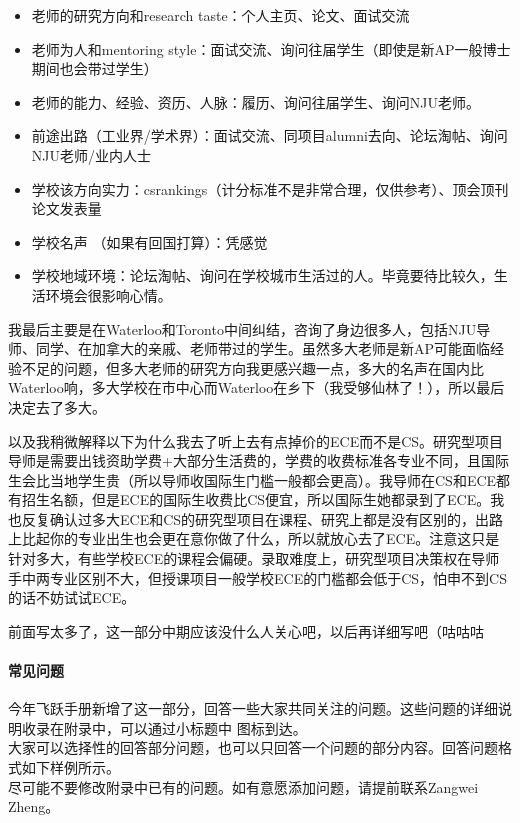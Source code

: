 \begin{itemize}
    \item 老师的研究方向和research taste：个人主页、论文、面试交流
    \item 老师为人和mentoring style：面试交流、询问往届学生（即使是新AP一般博士期间也会带过学生）
    \item 老师的能力、经验、资历、人脉：履历、询问往届学生、询问NJU老师。
    \item 前途出路（工业界/学术界）：面试交流、同项目alumni去向、论坛淘帖、询问NJU老师/业内人士
    \item 学校该方向实力：csrankings（计分标准不是非常合理，仅供参考）、顶会顶刊论文发表量
    \item 学校名声 （如果有回国打算）：凭感觉
    \item 学校地域环境：论坛淘帖、询问在学校城市生活过的人。毕竟要待比较久，生活环境会很影响心情。
\end{itemize}

我最后主要是在Waterloo和Toronto中间纠结，咨询了身边很多人，包括NJU导师、同学、在加拿大的亲戚、老师带过的学生。虽然多大老师是新AP可能面临经验不足的问题，但多大老师的研究方向我更感兴趣一点，多大的名声在国内比Waterloo响，多大学校在市中心而Waterloo在乡下（我受够仙林了！），所以最后决定去了多大。

以及我稍微解释以下为什么我去了听上去有点掉价的ECE而不是CS。研究型项目导师是需要出钱资助学费+大部分生活费的，学费的收费标准各专业不同，且国际生会比当地学生贵（所以导师收国际生门槛一般都会更高）。我导师在CS和ECE都有招生名额，但是ECE的国际生收费比CS便宜，所以国际生她都录到了ECE。我也反复确认过多大ECE和CS的研究型项目在课程、研究上都是没有区别的，出路上比起你的专业出生也会更在意你做了什么，所以就放心去了ECE。注意这只是针对多大，有些学校ECE的课程会偏硬。录取难度上，研究型项目决策权在导师手中两专业区别不大，但授课项目一般学校ECE的门槛都会低于CS，怕申不到CS的话不妨试试ECE。

前面写太多了，这一部分中期应该没什么人关心吧，以后再详细写吧（咕咕咕


\paragraph{常见问题 \hyperref[optional]{\faLink}}

今年飞跃手册新增了这一部分，回答一些大家共同关注的问题。这些问题的详细说明收录在附录中，可以通过小标题中 \faLink 图标到达。\\
大家可以选择性的回答部分问题，也可以只回答一个问题的部分内容。回答问题格式如下样例所示。\\
尽可能不要修改附录中已有的问题。如有意愿添加问题，请提前联系Zangwei Zheng。\\

